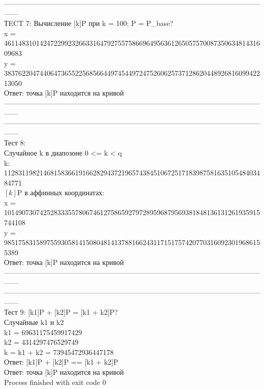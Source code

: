 \documentclass[a4paper,12pt]{article}
\begin{document}
	------------------------------------------------------------------------------------------------------------------\\
	ТECT 7: Вычисление [k]P при k = 100; P = P\_base?\\
	x = 46114831014247229923266331647927557586696495636126505757008735063481431609683\\
	y = 38376220474406473655225685664497454497247526062573712862044892681609942213050\\
	
	Ответ: точка [k]P находится на кривой\\
	------------------------------------------------------------------------------------------------------------------\\
	
	------------------------------------------------------------------------------------------------------------------\\
	Тест 8:\\
	Случайное k в диапозоне 0 <= k < q\\
	k: 11283119821468158366191662829437219657438451067251718398758163510548403484771\\
	$[k]$P в аффинных координатах:\\
	x = 101490730742528333557806746127586592797289596879569381848136131261935915744108\\
	y = 9851758315897559305814150804814137881662431171517574207703160923019686155389\\
	
	Ответ: точка [k]P находится на кривой\\
	------------------------------------------------------------------------------------------------------------------\\
	
	------------------------------------------------------------------------------------------------------------------\\
	Тест 9: [k1]P + [k2]P = [k1 + k2]P?\\
	Случайные k1 и k2\\
	k1 = 69631175459917429\\
	k2 = 4314297476529749\\
	k = k1 + k2 = 73945472936447178\\
	Ответ: [k1]P + [k2]P == [k1 + k2]P\\
	Ответ: точка [k]P находится на кривой\\
	
	Process finished with exit code 0
	
\end{document}
